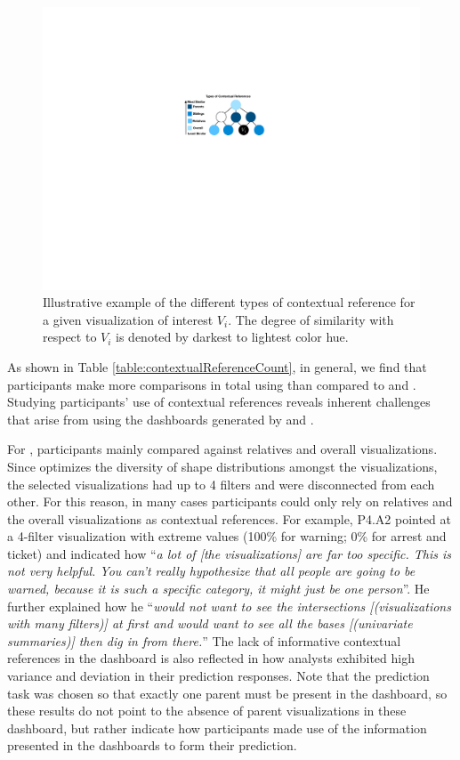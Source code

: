 \begin{figure}[h!]
\centering
\includegraphics[width=0.7\linewidth]{figures/contextual_reference.pdf}
\caption{Illustrative example of the different types of contextual reference for a given visualization of interest $V_i$. The degree of similarity with respect to $V_i$ is denoted by darkest to lightest color hue.}
\label{fig:reference}
\end{figure}
As shown in Table \ref{table:contextualReferenceCount}, in general, we find that participants make more comparisons in total using \system than compared to \cluster and \BFS. Studying participants' use of contextual references reveals inherent challenges that arise from using the dashboards generated by \BFS and \cluster. 
\par For \cluster, participants mainly compared against relatives and overall visualizations. Since \cluster optimizes the diversity of shape distributions amongst the visualizations, the selected visualizations had up to 4 filters and were disconnected from each other. For this reason, in many cases participants could only rely on relatives and the overall visualizations as contextual references. For example, P4.A2 pointed at a 4-filter visualization with extreme values (100\% for warning; 0\% for arrest and ticket) and indicated how ``\textit{a lot of [the visualizations] are far too specific. This is not very helpful. You can't really hypothesize that all people are going to be warned, because it is such a specific category, it might just be one person}''. %
He further explained how he ``\textit{would not want to see the intersections [(visualizations with many filters)] at first and would want to see all the bases [(univariate summaries)] then dig in from there.}'' The lack of informative contextual references in the \cluster dashboard is also reflected in how analysts exhibited high variance and deviation in their prediction responses. Note that the prediction task was chosen so that exactly one parent must be present in the dashboard, so these results do not point to the absence of parent visualizations in these dashboard, but rather indicate how participants made use of the information presented in the dashboards to form their prediction. 
